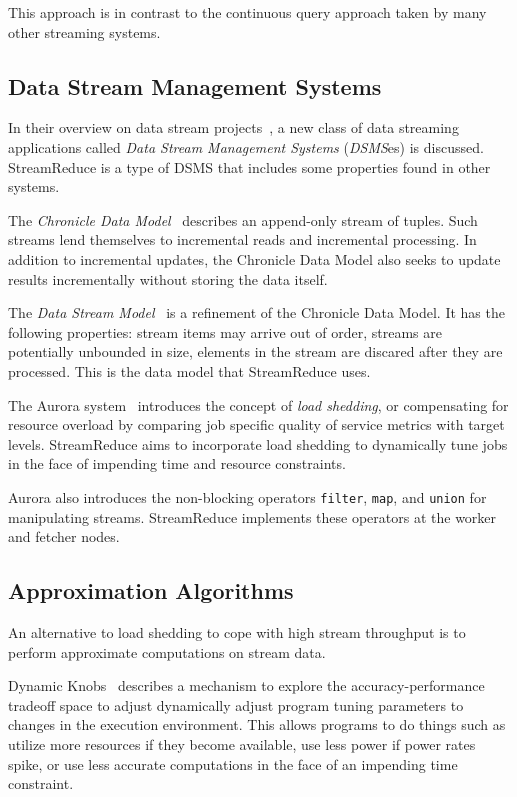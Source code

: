 \documentclass[12pt,twocolumn]{article}
\begin{document}
This approach is in contrast to the continuous query approach taken by many other streaming
systems.

\subsection{Data Stream Management Systems}
In their overview on data stream projects~\cite{Babcock:2002:MID:543613.543615},
a new class of data streaming applications
called \emph{Data Stream Management Systems} (\emph{DSMS}es) is discussed.
StreamReduce is a type of DSMS that includes some properties found in other systems.

The \emph{Chronicle Data Model}~\cite{Jagadish:1995:VMI:212433.220201} describes an
append-only stream of tuples. Such
streams lend themselves to incremental reads and incremental processing. In addition to incremental
updates, the Chronicle Data Model also seeks to update results incrementally without storing the
data itself.

The \emph{Data Stream Model}~\cite{Babcock:2002:MID:543613.543615} is a refinement of the Chronicle
Data Model. It has the following properties: stream items may arrive out of order,
streams are potentially unbounded in size, elements in the stream are discared after they are
processed. This is the data model that StreamReduce uses.

The Aurora system~\cite{Carney:2002:MSN:1287369.1287389} introduces the concept of
\emph{load shedding}, or compensating for
resource overload by comparing job specific quality of service metrics with target levels.
StreamReduce aims to incorporate load shedding to dynamically tune jobs in the face of
impending time and resource constraints.

Aurora also introduces the non-blocking operators
\texttt{filter}, \texttt{map}, and \texttt{union} for
manipulating streams. StreamReduce implements these operators at the worker and fetcher nodes.

\subsection{Approximation Algorithms}
An alternative to load shedding to cope with high stream throughput is to perform approximate
computations on stream data.

Dynamic Knobs~\cite{Hoffmann:2011:DKR:1950365.1950390} describes a mechanism to explore the
accuracy-performance tradeoff space to adjust dynamically adjust program tuning parameters
to changes in the execution environment. This allows programs to do things such as
utilize more resources if they become available, use less power if power rates spike,
or use less accurate computations in the face of an impending time constraint.
\end{document}
